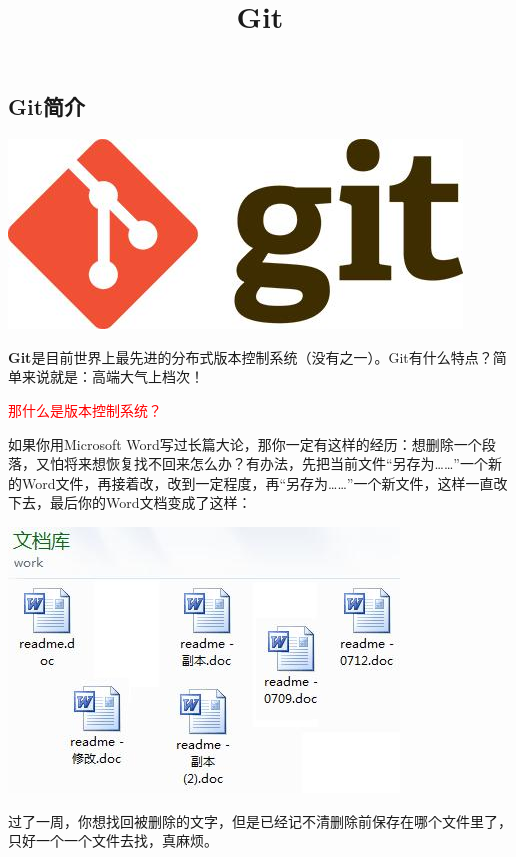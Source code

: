 \documentclass[•]{article}
\title{Git}
\begin{document}
\begin{CJK}{UTF8}{gbsn}
\maketitle

\section{Git简介}
\begin{center}
\includegraphics[scale=0.4]{0.jpeg}
\end{center}

\qquad \textbf{Git}是目前世界上最先进的分布式版本控制系统（没有之一）。Git有什么特点？简单来说就是：高端大气上档次！

\qquad \textcolor{red}{那什么是版本控制系统？}

\qquad 如果你用Microsoft Word写过长篇大论，那你一定有这样的经历：想删除一个段落，又怕将来想恢复找不回来怎么办？有办法，先把当前文件“另存为……”一个新的Word文件，再接着改，改到一定程度，再“另存为……”一个新文件，这样一直改下去，最后你的Word文档变成了这样：
\begin{center}
\includegraphics[scale=0.4]{1.jpeg}
\end{center}

\qquad 过了一周，你想找回被删除的文字，但是已经记不清删除前保存在哪个文件里了，只好一个一个文件去找，真麻烦。


\end{CJK}
\end{document}
